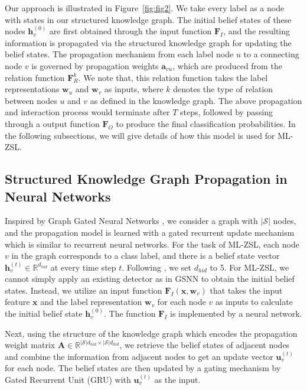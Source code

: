 \documentclass[10pt,twocolumn,letterpaper]{article}
\begin{document}
Our approach is illustrated in Figure~\ref{fig:fig2}. We take every label as a node with states in our structured knowledge graph. The initial belief states of these nodes $\mathbf{h}_v^{(0)}$ are first obtained through the input function $\mathbf{F}_I$, and the resulting information is propagated via the structured knowledge graph for updating the belief states. The propagation mechanism from each label node $u$ to a connecting node $v$ is governed by propagation weights $\mathbf{a}_{vu}$, which are produced from the relation function $\mathbf{F}^k_R$. We note that, this relation function takes the label representations $\mathbf{w}_u$ and $\mathbf{w}_v$ as inputs, where $k$ denotes the type of relation between nodes $u$ and $v$ as defined in the knowledge graph. The above propagation and interaction process would terminate after $T$ steps, followed by passing through a output function $\mathbf{F}_O$ to produce the final classification probabilities. In the following subsections, we will give details of how this model is used for ML-ZSL.

\subsection{Structured Knowledge Graph Propagation in Neural Networks}
Inspired by Graph Gated Neural Networks \cite{DBLP:journals/corr/LiTBZ15,Marino_2017_CVPR}, we consider a graph with $|\mathcal{S}|$ nodes, and the propagation model is learned with a gated recurrent update mechanism which is similar to recurrent neural networks. For the task of ML-ZSL, each node $v$ in the graph corresponds to a class label, and there is a belief state vector $\mathbf{h}_v^{(t)} \in \mathbb{R}^{d_{hid}}$ at every time step $t$. Following \cite{Marino_2017_CVPR}, we set $d_{hid}$ to 5. For ML-ZSL, we cannot simply apply an existing detector as in GSNN to obtain the initial belief states. Instead, we utilize an input function $\mathbf{F}_I(\mathbf{x},\mathbf{w}_v)$ that takes the input feature $\mathbf{x}$ and the label representation $\mathbf{w}_v$ for each node $v$ as inputs to calculate the initial belief state $\mathbf{h}_v^{(0)}$.
The function $\mathbf{F}_I$ is implemented by a neural network.

Next, using the structure of the knowledge graph which encodes the propagation weight matrix $\mathbf{A} \in \mathbb{R}^{|\mathcal{S}|d_{hid}\times |\mathcal{S}|d_{hid}}$, we retrieve the belief states of adjacent nodes and combine the information from adjacent nodes to get an update vector $\mathbf{u}_v^{(t)}$ for each node. The belief states are then updated by a gating mechanism by Gated Recurrent Unit (GRU) with $\mathbf{u}_v^{(t)}$ as the input. 
\end{document}
